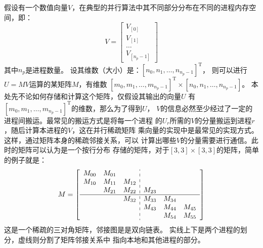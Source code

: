 \documentclass[UTF8,zihao=5]{ctexart} %
\newcommand{\trans}[0]{^\mathrm{T}}
\begin{document}
假设有一个数值向量\(V\)，在典型的并行算法中其不同部分分布在不同的进程内存空间，即：
\begin{equation*}
    V = \begin{bmatrix}
        V_{[0]} \\
        V_{[1]} \\
        \dots   \\
        V_{[n_p-1]}
    \end{bmatrix}
\end{equation*}
其中\(n_p\)是进程数量。
设其维数（大小）是：\([n_0,n_1,\dots,n_{n_p-1}]\trans\)，
则可以进行\(U=MV\)运算的某矩阵\(M\)，有维数
\([m_0,m_1,\dots,m_{n_p-1}]\trans\times[n_0,n_1,\dots,n_{n_p-1}]\)。
本处先不论如何存储和计算这个矩阵，仅假设其输出的向量$U$
有\([m_0,m_1,\dots,m_{n_p-1}]\trans\)的维数，那么为了得到$U$，
$V$的信息必然至少经过了一定的进程间搬运。最常见的搬运方式是将每一个进程
的$U_{r}$所需的$V$的分量搬运到进程$r$，随后计算本进程的$V$，这在并行稀疏矩阵
乘向量的实现中是最常见的实现方式。这样，通过矩阵本身的稀疏邻接关系，可以
计算出哪些$V$的分量需要进行通信。此时的矩阵可以认为是一个按行分布
存储的矩阵，对于$[3,3]\times[3,3]$的矩阵，简单的例子就是：
\begin{equation}
    M=
    \left[
        \begin{array}{ccc:ccc}
            M_{00} & M_{01} &        &        &        &        \\
            M_{10} & M_{11} & M_{12} &        &        &        \\
                   & M_{21} & M_{22} & M_{23} &        &        \\
            \hline
                   &        & M_{32} & M_{33} & M_{34} &        \\
                   &        &        & M_{43} & M_{44} & M_{45} \\
                   &        &        &        & M_{54} & M_{55} \\
        \end{array}
        \right]
    \label{eq:sparseMat}
\end{equation}
这是一个稀疏的三对角矩阵，邻接图是是双向链表。
实线上下是两个进程的划分，虚线则分割了矩阵邻接关系中
指向本地和其他进程的部分。
\end{document}
